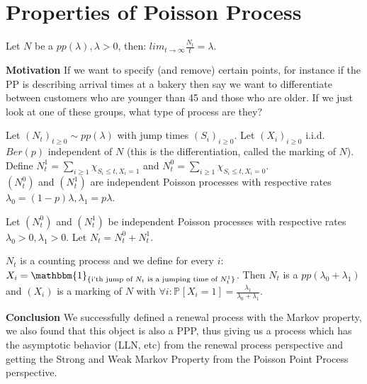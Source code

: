 \section{Properties of Poisson Process}

\begin{theorem}
Let $N$ be a $pp(\lambda), \lambda > 0$, then: $lim_{t \to \infty} \frac{N_t}{t}=\lambda$.
\end{theorem}

\textbf{Motivation} If we want to specify (and remove) certain points, for instance if the PP is describing arrival times at a bakery then say we want to differentiate between customers who are younger than 45 and those who are older. If we just look at one of these groups, what type of process are they?

\begin{theorem}[Thinning]
	Let $(N_t)_{t\geq 0} \sim pp(\lambda)$ with jump times $(S_i)_{i\geq 0}$. Let $(X_i)_{i\geq 0}$ i.i.d. $Ber(p)$ independent of $N$ (this is the differentiation, called the marking of $N$). Define $N_t^1 = \sum_{i\geq 1}^{} \chi_{S_i \leq t, X_i = 1}$ and $N_t^0 = \sum_{i \geq 1}^{} \chi_{S_i \leq t, X_i = 0}$.
\\ \noindent	
	$(N_t^0)$ and  $(N_t^1)$ are independent Poisson processes with respective rates  $\lambda_0 = (1-p)\lambda, \lambda _1=p\lambda $.
\end{theorem}

Let $(N_t^0)$ and $(N_t^1)$ be independent Poisson processes with respective rates $\lambda_0> 0, \lambda_1> 0$. Let $N_t = N_t^0 + N_t^1$.
\begin{theorem}[]
$N_t$ is a counting process and we define for every $i $: $X_i = \mathbbm{1}_{\textrm{\{i'th jump of }N_t\textrm{ is a jumping time of }N_t^1\}}$. Then  $N_t$ is a $pp(\lambda_0 + \lambda_1)$ and  $(X_i)$ is a marking of  $N$ with $\forall i: \mathbb{P}_{} \left[ X_i=1 \right] = \frac{\lambda_1}{\lambda_0+\lambda_1}$.
\end{theorem}

\noindent \textbf{Conclusion} We successfully defined a renewal process with the Markov property, we also found that this object is also a PPP, thus giving us a process which has the asymptotic behavior (LLN, etc) from the renewal process perspective and getting the Strong and Weak Markov Property from the Poisson Point Process perspective. 


